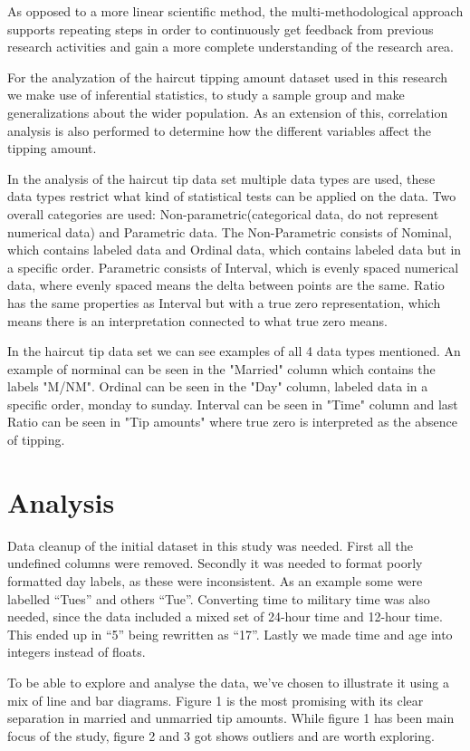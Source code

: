 \documentclass[twoside,twocolumn]{article}
\begin{document}
As opposed to a more linear scientific method, the multi-methodological approach supports repeating steps in order to continuously get feedback from previous research activities and gain a more complete understanding of the research area.

For the analyzation of the haircut tipping amount dataset used in this research we make use of inferential statistics, to study a sample group and make generalizations about the wider population. As an extension of this, correlation analysis is also performed to determine how the different variables affect the tipping amount.

In the analysis of the haircut tip data set multiple data types are used, these data types restrict what kind of statistical tests can be applied on the data. Two overall categories are used: Non-parametric(categorical data, do not represent numerical data) and Parametric data. The Non-Parametric consists of Nominal, which contains labeled data and Ordinal data, which contains labeled data but in a specific order. Parametric consists of Interval, which is evenly spaced numerical data, where evenly spaced means the delta between points are the same. Ratio has the same properties as Interval but with a true zero representation, which means there is an interpretation connected to what true zero means.

In the haircut tip data set we can see examples of all 4 data types mentioned. An example of norminal can be seen in the "Married" column which contains the labels "M/NM". Ordinal can be seen in the "Day" column, labeled data in a specific order, monday to sunday. Interval can be seen in "Time" column and last Ratio can be seen in "Tip amounts" where true zero is interpreted as the absence of tipping.

\section{Analysis}Data cleanup of the initial dataset in this study was needed. First all the undefined columns were removed. Secondly it was needed to format poorly formatted day labels, as these were inconsistent. As an example some were labelled “Tues” and others “Tue”. Converting time to military time was also needed, since the data included a mixed set of 24-hour time and 12-hour time. This ended up in “5” being rewritten as “17”. Lastly we made time and age into integers instead of floats.

To be able to explore and analyse the data, we've chosen to illustrate it using a mix of line and bar diagrams. Figure 1 is the most promising with its clear separation in married and unmarried tip amounts. While figure 1 has been main focus of the study, figure 2 and 3 got shows outliers and are worth exploring.
\end{document}
